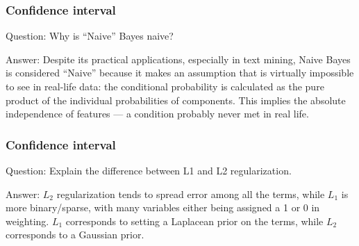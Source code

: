 \documentclass[11pt]{beamer}
\begin{document}
\begin{frame}
\frametitle{Confidence interval}
\begin{block}{Question:}
	Why is “Naive” Bayes naive?
\end{block}
\begin{block}{Answer:}
	Despite its practical applications, especially in text mining, Naive Bayes is considered “Naive” because it makes an assumption that is virtually impossible to see in real-life data: the conditional probability is calculated as the pure product of the individual probabilities of components. This implies the absolute independence of features — a condition probably never met in real life.
\end{block}
\end{frame}

\begin{frame}
\frametitle{Confidence interval}
\begin{block}{Question:}
	Explain the difference between L1 and L2 regularization.
\end{block}
\begin{block}{Answer:}
	$L_2$ regularization tends to spread error among all the terms, while $L_1$ is more binary/sparse, with many variables either being assigned a 1 or 0 in weighting. $L_1$ corresponds to setting a Laplacean prior on the terms, while $L_2$ corresponds to a Gaussian prior.
\end{block}
\end{frame}
\end{document}
